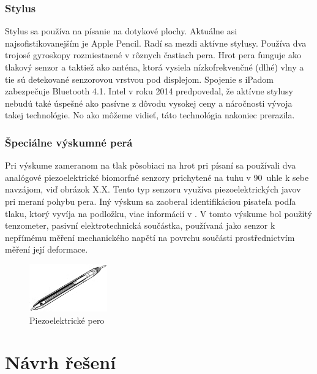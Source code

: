 \subsection*{Stylus}

Stylus sa používa na písanie na dotykové plochy. Aktuálne asi najsofistikovanejším je Apple Pencil. Radí sa mezdi aktívne stylusy\cite{HarleyJonahA2013As}. Používa dva trojosé gyroskopy rozmiestnené v rôznych častiach pera. Hrot pera funguje ako tlakový senzor a taktiež ako anténa, ktorá vysiela nízkofrekvenčné (dlhé) vlny a tie sú detekované senzorovou vrstvou pod displejom. Spojenie s iPadom zabezpečuje Bluetooth 4.1\cite{ApplePencilForum}. Intel v roku 2014 predpovedal, že aktívne stylusy nebudú také úspešné ako pasívne z dôvodu vysokej ceny a náročnosti vývoja takej technológie\cite{IntelDisp}. No ako môžeme vidieť, táto technológia nakoniec prerazila.\newline

\subsection*{Špeciálne výskumné perá}

Pri výskume zameranom na tlak pôsobiaci na hrot pri písaní sa používali dva analógové piezoelektrické biomorfné senzory prichytené na tuhu v 90\degree~uhle k sebe navzájom\cite{EernisseE}, viď obrázok X.X. Tento typ senzoru využíva piezoelektrických javov pri meraní pohybu pera. Iný výskum sa zaoberal identifikáciou pisateľa podľa tlaku, ktorý vyvíja na podložku, viac informácií v \cite{SchomakerL.1990Trbp}. V tomto výskume bol použitý tenzometer, pasivní elektrotechnická součástka, používaná jako senzor k nepřímému měření mechanického napětí na povrchu součásti prostřednictvím měření její deformace\cite{Tenzometr}.

\begin{figure}[hbt]
	\centering
	\includegraphics[width=0.3\textwidth]{obrazky-figures/piezoPen1997.png}
	\caption{Piezoelektrické pero}
	\label{piezoPen1997}
\end{figure}

\chapter{Návrh řešení}

